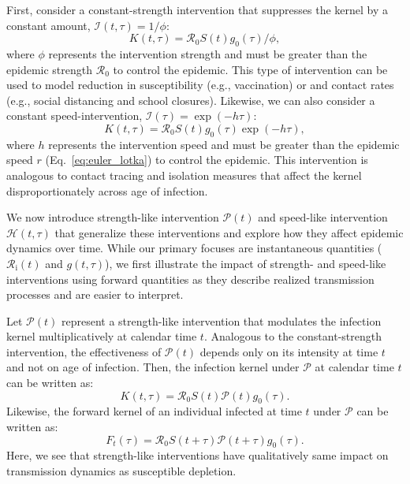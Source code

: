 \documentclass[12pt]{article}
\newcommand{\eref}[1]{Eq.~\ref{eq:#1}}
\newcommand{\Rx}[1]{\ensuremath{{\mathcal R}_{#1}}\xspace}
\newcommand{\Ro}{\Rx{0}}
\newcommand{\Ri}{\Rx{\mathrm{i}}}
\newcommand{\PP}{{\mathcal P}}
\newcommand{\II}{\ensuremath{\mathcal I}}
\newcommand{\HH}{\ensuremath{\mathcal H}}
\begin{document}
First, consider a constant-strength intervention that suppresses the kernel by a constant amount, $\II(t, \tau) = 1/\phi$:
\begin{equation}
K(t, \tau) = \Ro S(t) g_0(\tau)/\phi,
\end{equation}
where $\phi$ represents the intervention strength and must be greater than the epidemic strength $\Ro$ to control the epidemic.
This type of intervention can be used to model reduction in susceptibility (e.g., vaccination) or and contact rates (e.g., social distancing and school closures).
Likewise, we can also consider a constant speed-intervention, $\II(\tau) = \exp(-h\tau)$:
\begin{equation}
K(t, \tau) = \Ro S(t) g_0(\tau) \exp(-h\tau),
\end{equation}
where $h$ represents the intervention speed and must be greater than the epidemic speed $r$ (\eref{euler_lotka}) to control the epidemic.
This intervention is analogous to contact tracing and isolation measures that affect the kernel disproportionately across age of infection.

We now introduce strength-like intervention $\PP(t)$ and speed-like intervention $\HH(t, \tau)$ that generalize these interventions and explore how they affect epidemic dynamics over time.
While our primary focuses are instantaneous quantities ($\Ri(t)$ and $g(t, \tau)$), we first illustrate the impact of strength- and speed-like interventions using forward quantities as they describe realized transmission processes and are easier to interpret.

Let $\PP(t)$ represent a strength-like intervention that modulates the infection kernel multiplicatively at calendar time $t$.
Analogous to the constant-strength intervention, the effectiveness of $\PP(t)$ depends only on its intensity at time $t$ and not on age of infection. 
Then, the infection kernel under $\PP$ at calendar time $t$ can be written as:
\begin{equation}
K(t, \tau) = \Ro S(t) \PP(t) g_0(\tau).
\end{equation}
Likewise, the forward kernel of an individual infected at time $t$ under $\PP$ can be written as:
\begin{equation}
F_t(\tau) =  \Ro S(t+\tau) \PP(t + \tau) g_0(\tau).
\end{equation}
Here, we see that strength-like interventions have qualitatively same impact on transmission dynamics as susceptible depletion.
\end{document}
